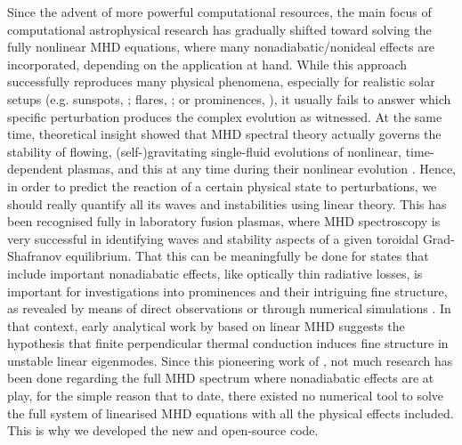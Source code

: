 Since the advent of more powerful computational resources, the main focus of computational astrophysical research has gradually shifted toward solving the fully nonlinear MHD equations, where many nonadiabatic/nonideal effects are incorporated, depending on the application at hand. While this approach successfully reproduces many physical phenomena, especially for realistic solar setups (e.g. sunspots, \citet{rempel2012}; flares, \citet{ruan2019}; or prominences, \citet{xia2016}), it usually fails to answer which specific perturbation produces the complex evolution as witnessed. At the same time, theoretical insight showed that MHD spectral theory actually governs the stability of flowing, (self-)gravitating single-fluid evolutions of nonlinear, time-dependent plasmas, and this at any time during their nonlinear evolution \citep{demaerel2016}. Hence, in order to predict the reaction of a certain physical state to perturbations, we should really quantify all its waves and instabilities using linear theory. This has been recognised fully in laboratory fusion plasmas, where MHD spectroscopy is very successful in identifying waves and stability aspects of a given toroidal Grad-Shafranov equilibrium. That this can be meaningfully be done for states that include important nonadiabatic effects, like optically thin radiative losses, is important for investigations into prominences and their intriguing fine structure, as revealed by means of direct observations \citep{engvold1998,ballester2006,mackay2010} or through numerical simulations \citep{xia2016,xia2017,claes2020}. In that context, early analytical work by \citet{vanderlinden1991} based on linear MHD suggests the hypothesis that finite perpendicular thermal conduction induces fine structure in unstable linear eigenmodes. Since this pioneering work of \citet{vanderlinden1991}, not much research has been done regarding the full MHD spectrum where nonadiabatic effects are at play, for the simple reason that to date, there existed no numerical tool to solve the full system of linearised MHD equations with all the physical effects included. This is why we developed the new and open-source {\legolas} code.

